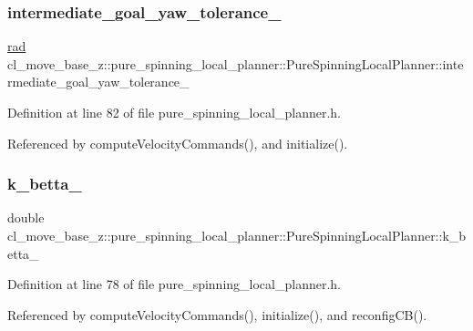 \subsubsection{\texorpdfstring{intermediate\+\_\+goal\+\_\+yaw\+\_\+tolerance\+\_\+}{intermediate\_goal\_yaw\_tolerance\_}}
{\footnotesize\ttfamily \hyperlink{backward__local__planner_8h_a640effbe91ae9b25d698a883a9e80d96}{rad} cl\+\_\+move\+\_\+base\+\_\+z\+::pure\+\_\+spinning\+\_\+local\+\_\+planner\+::\+Pure\+Spinning\+Local\+Planner\+::intermediate\+\_\+goal\+\_\+yaw\+\_\+tolerance\+\_\+\hspace{0.3cm}{\ttfamily [private]}}



Definition at line 82 of file pure\+\_\+spinning\+\_\+local\+\_\+planner.\+h.



Referenced by compute\+Velocity\+Commands(), and initialize().

\mbox{\label{classcl__move__base__z_1_1pure__spinning__local__planner_1_1PureSpinningLocalPlanner_a379d2ba057231d76edd1a661d3572d68}} 
\subsubsection{\texorpdfstring{k\+\_\+betta\+\_\+}{k\_betta\_}}
{\footnotesize\ttfamily double cl\+\_\+move\+\_\+base\+\_\+z\+::pure\+\_\+spinning\+\_\+local\+\_\+planner\+::\+Pure\+Spinning\+Local\+Planner\+::k\+\_\+betta\+\_\+\hspace{0.3cm}{\ttfamily [private]}}



Definition at line 78 of file pure\+\_\+spinning\+\_\+local\+\_\+planner.\+h.



Referenced by compute\+Velocity\+Commands(), initialize(), and reconfig\+C\+B().

